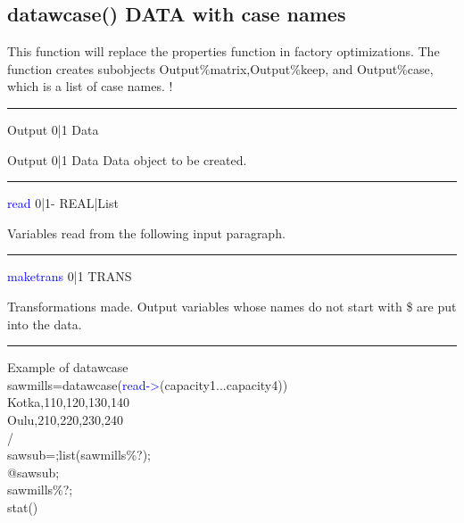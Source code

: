 \subsection{\textcolor{VioletRed}{datawcase}() DATA with case names}
\label{datawcase}
This function will replace the properties function in factory optimizations.
The function creates subobjects Output\%matrix,Output\%keep, and Output\%case, which is a list of case names.
	!
\vspace{0.3cm}
\hrule
\vspace{0.3cm}
\noindent Output  \tabto{3cm} 0|1 \tabto{5cm}  Data \tabto{7cm}
\begin{changemargin}{3cm}{0cm}
\noindent \noindent Output  \tabto{3cm} 0|1 \tabto{5cm}  Data \tabto{7cm}
Data object to be created.
\end{changemargin}
\vspace{0.3cm}
\hrule
\vspace{0.3cm}
\noindent \textcolor{blue}{read}  \tabto{3cm} 0|1- \tabto{5cm}  REAL|List \tabto{7cm}
\begin{changemargin}{3cm}{0cm}
\noindent  Variables read from the following input paragraph.
\end{changemargin}
\vspace{0.3cm}
\hrule
\vspace{0.3cm}
\noindent \textcolor{blue}{maketrans}  \tabto{3cm} 0|1 \tabto{5cm}  TRANS \tabto{7cm}
\begin{changemargin}{3cm}{0cm}
\noindent  Transformations made. Output variables whose names do not start with \$ are put into the data.
\end {changemargin}
\hrule
\vspace{0.2cm}
\begin{example}[datawcaseex]Example of datawcase\\
\label{datawcaseex}
sawmills=\textcolor{VioletRed}{datawcase}(\textcolor{blue}{read->}(capacity1...capacity4))\\
Kotka,110,120,130,140\\
Oulu,210,220,230,240\\
/\\
sawsub=;list(sawmills\%?);\\
@sawsub;\\
sawmills\%?;\\
\textcolor{VioletRed}{stat}()
\end{example}
